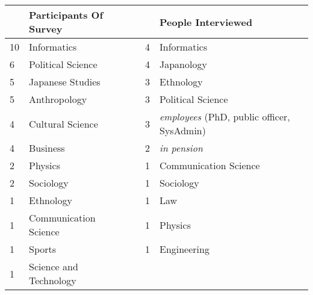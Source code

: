 \begin{tabular}{lllll}
\toprule
   & \textbf{Participants Of Survey} &  &   & \textbf{People Interviewed}                        \\
   \midrule
10 & Informatics                            &  & 4 & Informatics                                        \\
6  & Political Science                      &  & 4 & Japanology                                         \\
5  & Japanese Studies                       &  & 3 & Ethnology                                          \\
5  & Anthropology                           &  & 3 & Political Science                                  \\
4  & Cultural Science                       &  & 3 & \textit{employees} (PhD, public officer, SysAdmin) \\
4  & Business                               &  & 2 & \textit{in pension}                                \\
2  & Physics                                &  & 1 & Communication Science                              \\
2  & Sociology                              &  & 1 & Sociology                                          \\
1  & Ethnology                              &  & 1 & Law                                                \\
1  & Communication Science                  &  & 1 & Physics                                            \\
1  & Sports                                 &  & 1 & Engineering                                        \\
1  & Science and Technology                 &  &   &               \\
\bottomrule
\end{tabular}